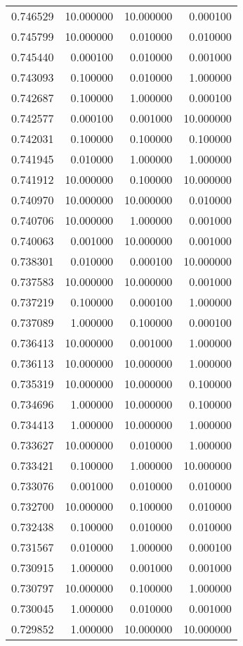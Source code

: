 \begin{tabular}{rrrr}
0.746529 & 10.000000 & 10.000000 & 0.000100 \\
0.745799 & 10.000000 & 0.010000 & 0.010000 \\
0.745440 & 0.000100 & 0.010000 & 0.001000 \\
0.743093 & 0.100000 & 0.010000 & 1.000000 \\
0.742687 & 0.100000 & 1.000000 & 0.000100 \\
0.742577 & 0.000100 & 0.001000 & 10.000000 \\
0.742031 & 0.100000 & 0.100000 & 0.100000 \\
0.741945 & 0.010000 & 1.000000 & 1.000000 \\
0.741912 & 10.000000 & 0.100000 & 10.000000 \\
0.740970 & 10.000000 & 10.000000 & 0.010000 \\
0.740706 & 10.000000 & 1.000000 & 0.001000 \\
0.740063 & 0.001000 & 10.000000 & 0.001000 \\
0.738301 & 0.010000 & 0.000100 & 10.000000 \\
0.737583 & 10.000000 & 10.000000 & 0.001000 \\
0.737219 & 0.100000 & 0.000100 & 1.000000 \\
0.737089 & 1.000000 & 0.100000 & 0.000100 \\
0.736413 & 10.000000 & 0.001000 & 1.000000 \\
0.736113 & 10.000000 & 10.000000 & 1.000000 \\
0.735319 & 10.000000 & 10.000000 & 0.100000 \\
0.734696 & 1.000000 & 10.000000 & 0.100000 \\
0.734413 & 1.000000 & 10.000000 & 1.000000 \\
0.733627 & 10.000000 & 0.010000 & 1.000000 \\
0.733421 & 0.100000 & 1.000000 & 10.000000 \\
0.733076 & 0.001000 & 0.010000 & 0.010000 \\
0.732700 & 10.000000 & 0.100000 & 0.010000 \\
0.732438 & 0.100000 & 0.010000 & 0.010000 \\
0.731567 & 0.010000 & 1.000000 & 0.000100 \\
0.730915 & 1.000000 & 0.001000 & 0.001000 \\
0.730797 & 10.000000 & 0.100000 & 1.000000 \\
0.730045 & 1.000000 & 0.010000 & 0.001000 \\
0.729852 & 1.000000 & 10.000000 & 10.000000 \\

\end{tabular}
